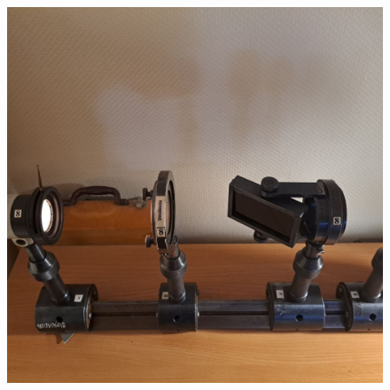 \documentclass[14pt, a4paper]{report}
\begin{document}
\begin{enumerate}
\begin{figure}[H]
\centering
\includegraphics[scale=0.2]{../images/473_5}
\end{figure}
\begin{figure}[H]
\centering

\end{figure}
\end{enumerate}
\end{document}
